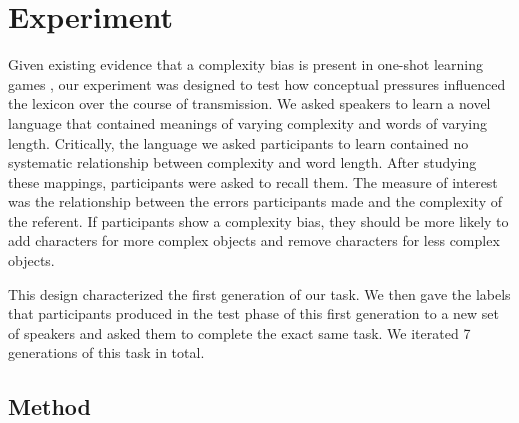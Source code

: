 








\section{Experiment }

Given existing evidence that a complexity bias is present in one-shot learning games \cite{lewisstructure2014}, our experiment was designed to test how conceptual pressures influenced the lexicon over the course of transmission. We asked speakers to learn a novel language that contained meanings of varying complexity and words of varying length. Critically, the language we asked participants to learn contained no systematic relationship between complexity and word length. After studying these mappings, participants were asked to recall them. The measure of interest was the relationship between the errors participants made and the complexity of the referent. If participants show a complexity bias, they should be more likely to add characters for more complex objects and remove characters for less complex objects. 

This design characterized the first generation of our task. We then gave the labels that participants produced in the test phase of this first generation to a new set of speakers and asked them to complete the exact same task. We iterated 7 generations of this task in total.


\subsection{Method}

